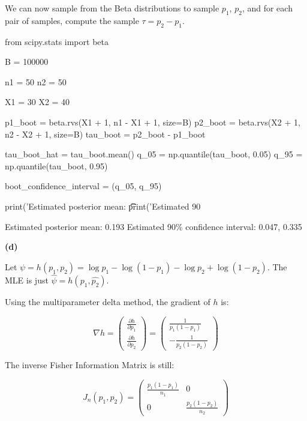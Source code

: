 We can now sample from the Beta distributions to sample \(p_{1}\),
\(p_{2}\), and for each pair of samples, compute the sample
\(\tau = p_{2} - p_{1}\).

\begin{python}
from scipy.stats import beta

B = 100000

n1 = 50
n2 = 50

X1 = 30
X2 = 40

p1_boot = beta.rvs(X1 + 1, n1 - X1 + 1, size=B)
p2_boot = beta.rvs(X2 + 1, n2 - X2 + 1, size=B)
tau_boot = p2_boot - p1_boot

tau_boot_hat = tau_boot.mean()
q_{0}5 = np.quantile(tau_boot, 0.05)
q_95 = np.quantile(tau_boot, 0.95)

boot_confidence_{i}nterval = (q_{0}5, q_95)

print('Estimated posterior mean: \t\t %
print('Estimated 90%
\end{python}

\begin{console}
Estimated posterior mean:                0.193
Estimated 90\% confidence interval:       0.047, 0.335
\end{console}

\textbf{(d)}

Let
\(\psi = h(p_{1}, p_{2}) = \log p_{1} - \log (1 - p_{1}) - \log p_{2} + \log (1 - p_{2})\).
The MLE is just \(\hat{\psi} = h(\hat{p_{1}}, \hat{p_{2}})\).

Using the multiparameter delta method, the gradient of \(h\) is:

\[\nabla h = 
\begin{pmatrix}
\frac{\partial h}{\partial p_{1}} \\ 
\frac{\partial h}{\partial p_{2}} \end{pmatrix}
= \begin{pmatrix}
\frac{1}{p_{1}(1 - p_{1})} \\
-\frac{1}{p_{2}(1 - p_{2})}
\end{pmatrix}
\]

The inverse Fisher Information Matrix is still:

\[J_{n}(p_{1}, p_{2}) = \begin{pmatrix}
\frac{p_{1}(1 - p_{1})}{n_{1}} & 0 \\
0 & \frac{p_{2}(1 - p_{2})}{n_{2}}
\end{pmatrix}\]

